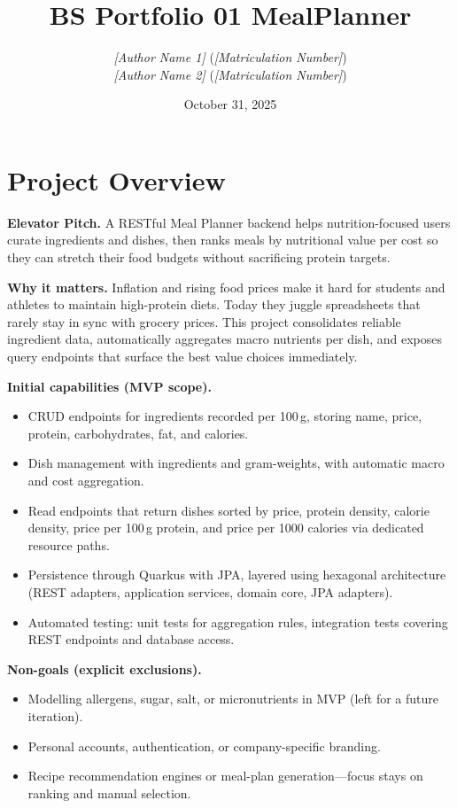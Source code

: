 \documentclass[11pt]{article}
\title{BS Portfolio 01 MealPlanner}
\author{
  \textit{[Author Name 1]} (\textit{[Matriculation Number]})\\
  \textit{[Author Name 2]} (\textit{[Matriculation Number]})
}
\date{October 31, 2025}
\begin{document}
\maketitle

\section{Project Overview}

\textbf{Elevator Pitch.} A RESTful Meal Planner backend helps nutrition-focused users curate ingredients and dishes, then ranks meals by nutritional value per cost so they can stretch their food budgets without sacrificing protein targets.

\textbf{Why it matters.} Inflation and rising food prices make it hard for students and athletes to maintain high-protein diets. Today they juggle spreadsheets that rarely stay in sync with grocery prices. This project consolidates reliable ingredient data, automatically aggregates macro nutrients per dish, and exposes query endpoints that surface the best value choices immediately.

\textbf{Initial capabilities (MVP scope).}
\begin{itemize}[noitemsep]
  \item CRUD endpoints for ingredients recorded per 100\,g, storing name, price, protein, carbohydrates, fat, and calories.
  \item Dish management with ingredients and gram-weights, with automatic macro and cost aggregation.
  \item Read endpoints that return dishes sorted by price, protein density, calorie density, price per 100\,g protein, and price per 1000 calories via dedicated resource paths.
  \item Persistence through Quarkus with JPA, layered using hexagonal architecture (REST adapters, application services, domain core, JPA adapters).
  \item Automated testing: unit tests for aggregation rules, integration tests covering REST endpoints and database access.
\end{itemize}

\textbf{Non-goals (explicit exclusions).}
\begin{itemize}[noitemsep]
  \item Modelling allergens, sugar, salt, or micronutrients in MVP (left for a future iteration).
  \item Personal accounts, authentication, or company-specific branding.
  \item Recipe recommendation engines or meal-plan generation---focus stays on ranking and manual selection.
\end{itemize}
\end{document}
